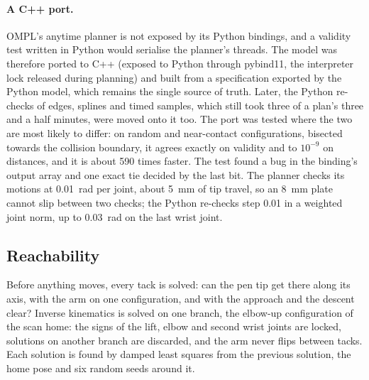 \paragraph{A C++ port.} OMPL's anytime planner is not exposed by its Python bindings, and a validity test
written in Python would serialise the planner's threads. The model was therefore ported to C++ (exposed
to Python through pybind11, the interpreter lock released during planning) and built from a
specification exported by the Python model, which remains the single source of truth. Later, the
Python re-checks of edges, splines and timed samples, which still took three of a plan's three and a
half minutes, were moved onto it too. The port was tested where the two are most
likely to differ: on random and near-contact configurations, bisected towards the collision boundary,
it agrees exactly on validity and to $10^{-9}$ on distances, and it is about 590 times faster. The test
found a bug in the binding's output array and one exact tie decided by the last bit. The planner checks
its motions at 0.01~rad per joint, about 5~mm of tip travel, so an 8~mm plate cannot slip between two
checks; the Python re-checks step 0.01 in a weighted joint norm, up to 0.03~rad on the last wrist joint.

\subsection{Reachability}
\label{sec:mc_reach}
Before anything moves, every tack is solved: can the pen tip get there along its axis, with the arm on
one configuration, and with the approach and the descent clear? Inverse kinematics is solved on one
branch, the elbow-up configuration of the scan home: the signs of the lift, elbow and second wrist
joints are locked, solutions on another branch are discarded, and the arm never flips between tacks.
Each solution is found by damped least squares from the previous solution, the home pose and six random
seeds around it.

